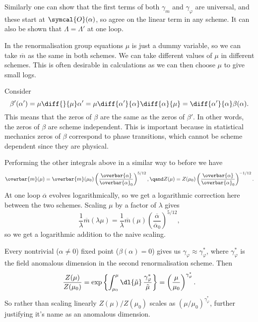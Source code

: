 \documentclass[fleqn]{NotesClass}
\newcommand{\order}{\symcal{O}}
\begin{document}
    Similarly one can show that the first terms of both \(\gamma_m\) and \(\gamma_\varphi\) are universal, and these start at \(\order(\alpha)\), so agree on the linear term in any scheme.
    It can also be shown that \(\Lambda = \Lambda'\) at one loop.
    
    In the renormalisation group equations \(\mu\) is just a dummy variable, so we can take \(\overbar{m}\) as the same in both schemes.
    We can take different values of \(\mu\) in different schemes.
    This is often desirable in calculations as we can then choose \(\mu\) to give small logs.
    
    Consider
    \begin{equation}
        \beta'(\alpha') = \mu\diff{}{\mu}\alpha' = \mu \diff{\alpha'}{\alpha}\diff{\alpha}{\mu} = \diff{\alpha'}{\alpha}\beta(\alpha).
    \end{equation}
    This means that the zeros of \(\beta\) are the same as the zeros of \(\beta'\).
    In other words, the zeros of \(\beta\) are scheme independent.
    This is important because in statistical mechanics zeros of \(\beta\) correspond to phase transitions, which cannot be scheme dependent since they are physical.
    
    Performing the other integrals above in a similar way to before we have
    \begin{equation}
        \overbar{m}(\mu) = \overbar{m}(\mu_0) \left( \frac{\overbar{\alpha}}{\overbar{\alpha}_0} \right)^{5/12}, \qand Z(\mu) = Z(\mu_0) \left( \frac{\overbar{\alpha}}{\overbar{\alpha}_0} \right)^{-1/12}.
    \end{equation}
    At one loop \(\overbar{\alpha}\) evolves logarithmically, so we get a logarithmic correction here between the two schemes.
    Scaling \(\mu\) by a factor of \(\lambda\) gives
    \begin{equation}
        \frac{1}{\lambda}\overbar{m}(\lambda\mu) = \frac{1}{\lambda} \overbar{m}(\mu) \left( \frac{\overbar{\alpha}}{\overbar{\alpha}_0} \right)^{5/12},
    \end{equation}
    so we get a logarithmic addition to the naive scaling.
    
    Every nontrivial (\(\alpha \ne 0\)) fixed point (\(\beta(\alpha) = 0\)) gives us \(\gamma_\varphi \approx \gamma_\varphi^*\), where \(\gamma_\varphi^*\) is the field anomalous dimension in the second renormalisation scheme.
    Then
    \begin{equation}
        \frac{Z(\mu)}{Z(\mu_0)} = \exp\left\{ \int_{\mu_0}^{\mu} \dl{\tilde{\mu}} \, \frac{\gamma_\varphi^*}{\tilde{\mu}} \right\} = \left( \frac{\mu}{\mu_0} \right)^{\gamma_{\varphi}^*}.
    \end{equation}
    So rather than scaling linearly \(Z(\mu)/Z(\mu_0)\) scales as \((\mu/\mu_0)^{\gamma_\varphi^*}\), further justifying it's name as an anomalous dimension.
    
\end{document}

